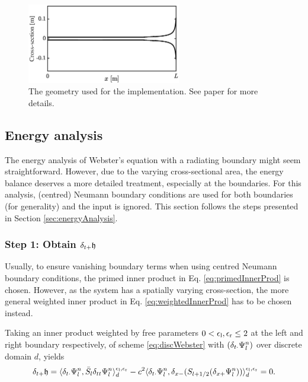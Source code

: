 {\renewcommand{\arraystretch}{1}

\hspace{0.1\textwidth}
\begin{figure}[h]
    \centering
    \includegraphics[width=0.6\textwidth]{figures/resonators/brass/geometryWebster.eps}
    \caption{The geometry used for the implementation. See paper \citeP[H] for more details. \label{fig:geometryWebster}}
\end{figure}


\subsection{Energy analysis}\label{sec:energyAnalysisWebster}
The energy analysis of Webster's equation with a radiating boundary might seem straightforward. However, due to the varying cross-sectional area, the energy balance deserves a more detailed treatment, especially at the boundaries. For this analysis, (centred) Neumann boundary conditions are used for both boundaries (for generality) and the input is ignored. This section follows the steps presented in Section \ref{sec:energyAnalysis}.%

\subsubsection{Step 1: Obtain $\delta_{t+} \mathfrak{h}$}
Usually, to ensure vanishing boundary terms when using centred Neumann boundary conditions, the primed inner product in Eq. \eqref{eq:primedInnerProd} is chosen. However, as the system has a spatially varying cross-section, the more general weighted inner product in Eq. \eqref{eq:weightedInnerProd} has to be chosen instead.

Taking an inner product weighted by free parameters $0 < \epsilon_\text{l}, \epsilon_\text{r} \leq 2$ at the left and right boundary respectively, of scheme \eqref{eq:discWebster} with $(\delta_{t\cdot} \Psi_l^n)$ over discrete domain $d$, yields 
\begin{equation}\label{eq:powerBalanceWebster}
    \delta_{t+} \mathfrak{h} = \langle \delta_{t\cdot}\Psi_l^n ,\bar{S}_l \delta_{tt}\Psi^n_l\rangle_d^{\epsilon_\text{l},\epsilon_\text{r}} - c^2\langle\delta_{t\cdot}\Psi_l^n, \delta_{x-}(S_{l+1/2}(\delta_{x+}\Psi_l^n))\rangle_d^{\epsilon_\text{l},\epsilon_\text{r}} = 0.
\end{equation}

}

